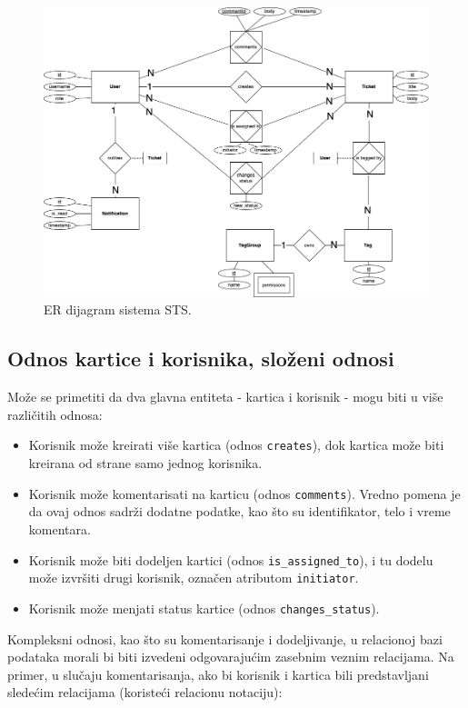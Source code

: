 \documentclass[12pt,oneside]{memoir}
\begin{document}
\begin{figure}[h]
  \centering
  \includegraphics[width=1\textwidth]{docs/images/ch_1/rdiagram.png} 
  \caption{ER dijagram sistema STS.}
\end{figure}

\newpage
\subsection{Odnos kartice i korisnika, složeni odnosi}
Može se primetiti da dva glavna entiteta - kartica i korisnik - mogu biti u više različitih odnosa:
\begin{itemize}
    \item Korisnik može kreirati više kartica (odnos \verb|creates|), dok kartica može biti kreirana od strane samo jednog korisnika.
    \item Korisnik može komentarisati na karticu (odnos \verb|comments|). Vredno pomena je da ovaj odnos sadrži dodatne podatke, kao što su identifikator, telo i vreme komentara.
    \item Korisnik može biti dodeljen kartici (odnos \verb|is_assigned_to|), i tu dodelu može izvršiti drugi korisnik, označen atributom \verb|initiator|.
    \item Korisnik može menjati status kartice (odnos \verb|changes_status|).
\end{itemize}

Kompleksni odnosi, kao što su komentarisanje i dodeljivanje, u relacionoj bazi podataka morali bi biti izvedeni odgovarajućim zasebnim veznim relacijama. Na primer, u slučaju komentarisanja, ako bi korisnik i kartica bili predstavljani sledećim relacijama (koristeći relacionu notaciju):
\end{document}
